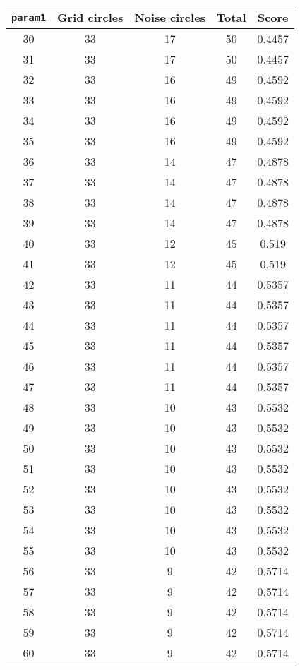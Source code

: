 \documentclass[letterpaper, 12pt]{article}
\begin{document}
\begin{longtable}{|c|c|c|c|c|}
\hline
\textbf{\texttt{param1}} & \textbf{Grid circles} & \textbf{Noise circles} & \textbf{Total} & \textbf{Score} \\
\hline
30 & 33 & 17 & 50 & 0.4457 \\
\hline
31 & 33 & 17 & 50 & 0.4457 \\
\hline
32 & 33 & 16 & 49 & 0.4592 \\
\hline
33 & 33 & 16 & 49 & 0.4592 \\
\hline
34 & 33 & 16 & 49 & 0.4592 \\
\hline
35 & 33 & 16 & 49 & 0.4592 \\
\hline
36 & 33 & 14 & 47 & 0.4878 \\
\hline
37 & 33 & 14 & 47 & 0.4878 \\
\hline
38 & 33 & 14 & 47 & 0.4878 \\
\hline
39 & 33 & 14 & 47 & 0.4878 \\
\hline
40 & 33 & 12 & 45 & 0.519 \\
\hline
41 & 33 & 12 & 45 & 0.519 \\
\hline
42 & 33 & 11 & 44 & 0.5357 \\
\hline
43 & 33 & 11 & 44 & 0.5357 \\
\hline
44 & 33 & 11 & 44 & 0.5357 \\
\hline
45 & 33 & 11 & 44 & 0.5357 \\
\hline
46 & 33 & 11 & 44 & 0.5357 \\
\hline
47 & 33 & 11 & 44 & 0.5357 \\
\hline
48 & 33 & 10 & 43 & 0.5532 \\
\hline
49 & 33 & 10 & 43 & 0.5532 \\
\hline
50 & 33 & 10 & 43 & 0.5532 \\
\hline
51 & 33 & 10 & 43 & 0.5532 \\
\hline
52 & 33 & 10 & 43 & 0.5532 \\
\hline
53 & 33 & 10 & 43 & 0.5532 \\
\hline
54 & 33 & 10 & 43 & 0.5532 \\
\hline
55 & 33 & 10 & 43 & 0.5532 \\
\hline
56 & 33 & 9 & 42 & 0.5714 \\
\hline
57 & 33 & 9 & 42 & 0.5714 \\
\hline
58 & 33 & 9 & 42 & 0.5714 \\
\hline
59 & 33 & 9 & 42 & 0.5714 \\
\hline
60 & 33 & 9 & 42 & 0.5714 \\

\end{longtable}
\end{document}
